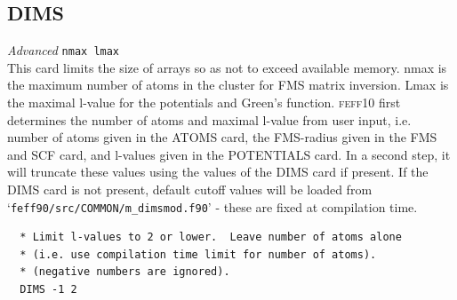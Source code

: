 \documentclass[11pt,oneside]{report} %
\newcommand{\program}[1]{\textsc{#1}}
\newcommand{\feff}{\program{feff}}
\newcommand{\vnum}{10}
\newcommand{\feffcur}{\feff\vnum}
\newenvironment{Card}[4]%
      {\vspace{3ex}%
        \subsection{#1}
        \quad\textsl{#3}\newline
        \quad\texttt{#2}\newline%
        \label{card:#4}\\}
      {}
\newcommand{\file}[1]{`\texttt{#1}'}
\begin{document}
\begin{Card}{DIMS}{nmax lmax}{Advanced}{dim}
  This card limits the size of arrays so as not to exceed available memory.  nmax is the maximum number of atoms in the cluster
  for FMS matrix inversion.  Lmax is the maximal l-value for the potentials and Green's function.
  {\feffcur} first determines the number of atoms and maximal l-value from user input, i.e. number of atoms given in the ATOMS card,
  the FMS-radius given in the FMS and SCF card, and l-values given in the POTENTIALS card.  In a second step, it will truncate these values using the values of the DIMS card if present.  If the DIMS card is not present, default cutoff values will be loaded from 
  \file{feff90/src/COMMON/m\_dimsmod.f90} - these are fixed at compilation time.
\begin{verbatim}
  * Limit l-values to 2 or lower.  Leave number of atoms alone 
  * (i.e. use compilation time limit for number of atoms).
  * (negative numbers are ignored).
  DIMS -1 2
\end{verbatim}
\end{Card}  
\end{document}
